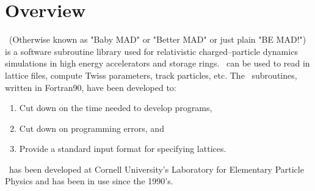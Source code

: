 \section*{Overview}

\bmad\ (Otherwise known as "Baby MAD" or "Better MAD" or just plain "BE MAD!")
is a software subroutine library used for relativistic
charged--particle dynamics simulations in high energy accelerators and
storage rings. \bmad\ can be used to read in lattice files, compute
Twiss parameters, track particles, etc.  The \bmad\ subroutines, written in
Fortran90, have been developed to:
\begin{enumerate}
\item Cut down on the time needed to develop programs,
\item Cut down on programming errors, and
\item Provide a standard input format for specifying lattices.
\end{enumerate}
\bmad\ has been developed at Cornell University's Laboratory for Elementary
Particle Physics and has been in use since the 1990's.
\vfill
\break
